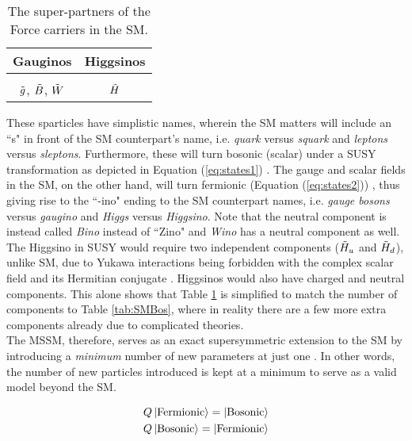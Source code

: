 \begin{table}[htbp]
    \centering
    \begin{tabular}{||c|c||}
    \hline 
       Gauginos  & Higgsinos \\
       \hline
        & \\[-2.5ex]
      $\Tilde{g}$, $\Tilde{B}$, $\Tilde{W}$ & $\Tilde{H}$ \\
     \hline
    \end{tabular}
    \caption{The super-partners of the Force carriers in the SM.}
    \label{tab:SUSYinos}
\end{table}

These sparticles have simplistic names, wherein the SM matters will include an ``s" in front of the SM counterpart's name, i.e. \textit{quark} versus \textit{squark} and \textit{leptons} versus \textit{sleptons}. Furthermore, these will turn bosonic (scalar) under a SUSY transformation as depicted in Equation (\ref{eq:states1}) \cite{martin1997supersymmetry}. The gauge and scalar fields in the SM, on the other hand, will turn fermionic (Equation (\ref{eq:states2})) \cite{martin1997supersymmetry}, thus giving rise to the ``-ino" ending to the SM counterpart names, i.e. \textit{gauge bosons} versus \textit{gaugino} and \textit{Higgs} versus \textit{Higgsino}. Note that the neutral component is instead called \textit{Bino} instead of ``Zino" and \textit{Wino} has a neutral component as well.  The Higgsino in SUSY would require two independent components ($\Tilde{H}_u$ and $ \Tilde{H}_d $), unlike SM, due to Yukawa interactions being forbidden with the complex scalar field and its Hermitian conjugate \cite{aitchison2007supersymmetry}. Higgsinos would also have charged and neutral components. This alone shows that Table \ref{tab:SUSYinos} is simplified to match the number of components to Table \ref{tab:SMBos}, where in reality there are a few more extra components already due to complicated theories. \\

The MSSM, therefore, serves as an exact supersymmetric extension to the SM by introducing a \textit{minimum} number of new parameters at just one \cite{aitchison2007supersymmetry}. In other words, the number of new particles introduced is kept at a minimum to serve as a valid model beyond the SM. \par
\begin{align}
     Q\ket{\text{Fermionic}} = \ket{\text{Bosonic}} 
     \label{eq:states1}
     \\
     Q\ket{\text{Bosonic}} = \ket{\text{Fermionic}}
     \label{eq:states2}
\end{align}


